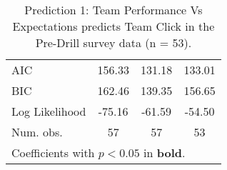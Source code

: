 \begin{table}
\begin{center}
\begin{tabular}{l c c c }
\midrule
AIC                                                 & 156.33   & 131.18                & 133.01                \\
BIC                                                 & 162.46   & 139.35                & 156.65                \\
Log Likelihood                                      & -75.16   & -61.59                & -54.50                \\
Num. obs.                                           & 57       & 57                    & 53                    \\
\bottomrule
\multicolumn{4}{l}{\scriptsize{Coefficients with $p < 0.05$ in \textbf{bold}.}}
\end{tabular}
\caption{Prediction 1: Team Performance Vs Expectations predicts Team Click in the Pre-Drill survey data (n = 53).}
\label{tab:TEM1groupPerfExpClick}
\end{center}
\end{table}
